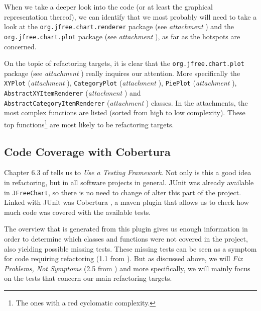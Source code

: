 \documentclass[11pt]{article}
\begin{document}
	When we take a deeper look into the code (or at least the graphical representation thereof), we can identify that we most probably will need to take a look at the \texttt{org.jfree.chart.renderer} package (see \textsl{attachment \pageref{hotspots-package-renderer}}) and the \texttt{org.jfree.chart.plot} package (see \textsl{attachment \pageref{hotspots-package-plot}}), as far as the hotspots are concerned.
	
	On the topic of refactoring targets, it is clear that the \texttt{org.jfree.chart.plot} package (see \textsl{attachment \pageref{refactoring-package-plot}}) really inquires our attention. More specifically the \texttt{XYPlot} (\textsl{attachment \pageref{refactoring-XYPlot}}), \texttt{CategoryPlot} (\textsl{attachment \pageref{refactoring-CategoryPlot}}), \texttt{PiePlot} (\textsl{attachment \pageref{refactoring-PiePlot}}), \texttt{AbstractXYItemRenderer} (\textsl{attachment \pageref{refactoring-AbstractXYItemRenderer}}) and\\ \texttt{AbstractCategoryItemRenderer} (\textsl{attachment \pageref{refactoring-AbstractCategoryItemRenderer}}) classes. In the attachments, the most complex functions are listed (sorted from high to low complexity). These top functions\footnote{The ones with a red cyclomatic complexity.} are most likely to be refactoring targets.
	
	\subsection{Code Coverage with Cobertura}
	\label{sec:coco}
	Chapter 6.3 of \cite{demeyer2009object} tells us to \textsl{Use a Testing Framework}. Not only is this a good idea in refactoring, but in all software projects in general. JUnit was already available in \texttt{JFreeChart}, so there is no need to change of alter this part of the project. Linked with JUnit was \textsf{Cobertura} \cite{cobertura}, a maven plugin that allows us to check how much code was covered with the available tests.
	
	The overview that is generated from this plugin gives us enough information in order to determine which classes and functions were not covered in the project, also yielding possible missing tests. These missing tests can be seen as a symptom for code requiring refactoring (1.1 from \cite{demeyer2009object}). But as discussed above, we will \textsl{Fix Problems, Not Symptoms} (2.5 from \cite{demeyer2009object}) and more specifically, we will mainly focus on the tests that concern our main refactoring targets.
	
\end{document}
